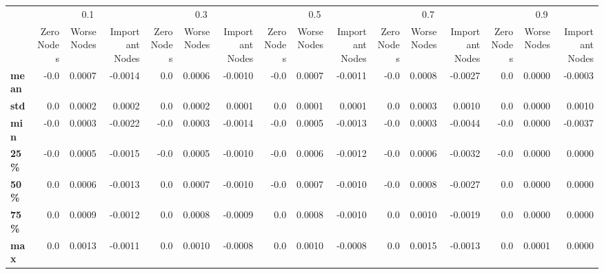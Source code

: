 \begin{tabular}{lrrrrrrrrrrrrrrr}
\toprule
{} & \multicolumn{3}{c}{0.1} & \multicolumn{3}{c}{0.3} & \multicolumn{3}{c}{0.5} & \multicolumn{3}{c}{0.7} & \multicolumn{3}{c}{0.9} \\
{} & Zero Nodes & Worse Nodes & Important Nodes & Zero Nodes & Worse Nodes & Important Nodes & Zero Nodes & Worse Nodes & Important Nodes & Zero Nodes & Worse Nodes & Important Nodes & Zero Nodes & Worse Nodes & Important Nodes \\
\midrule
\textbf{mean} &       -0.0 &      0.0007 &         -0.0014 &        0.0 &      0.0006 &         -0.0010 &       -0.0 &      0.0007 &         -0.0011 &       -0.0 &      0.0008 &         -0.0027 &        0.0 &      0.0000 &         -0.0003 \\
\textbf{std } &        0.0 &      0.0002 &          0.0002 &        0.0 &      0.0002 &          0.0001 &        0.0 &      0.0001 &          0.0001 &        0.0 &      0.0003 &          0.0010 &        0.0 &      0.0000 &          0.0010 \\
\textbf{min } &       -0.0 &      0.0003 &         -0.0022 &       -0.0 &      0.0003 &         -0.0014 &       -0.0 &      0.0005 &         -0.0013 &       -0.0 &      0.0003 &         -0.0044 &       -0.0 &      0.0000 &         -0.0037 \\
\textbf{25\% } &       -0.0 &      0.0005 &         -0.0015 &       -0.0 &      0.0005 &         -0.0010 &       -0.0 &      0.0006 &         -0.0012 &       -0.0 &      0.0006 &         -0.0032 &       -0.0 &      0.0000 &          0.0000 \\
\textbf{50\% } &        0.0 &      0.0006 &         -0.0013 &        0.0 &      0.0007 &         -0.0010 &       -0.0 &      0.0007 &         -0.0010 &       -0.0 &      0.0008 &         -0.0027 &        0.0 &      0.0000 &          0.0000 \\
\textbf{75\% } &        0.0 &      0.0009 &         -0.0012 &        0.0 &      0.0008 &         -0.0009 &        0.0 &      0.0008 &         -0.0010 &        0.0 &      0.0010 &         -0.0019 &        0.0 &      0.0000 &          0.0000 \\
\textbf{max } &        0.0 &      0.0013 &         -0.0011 &        0.0 &      0.0010 &         -0.0008 &        0.0 &      0.0010 &         -0.0008 &        0.0 &      0.0015 &         -0.0013 &        0.0 &      0.0001 &          0.0000 \\
\bottomrule
\end{tabular}
